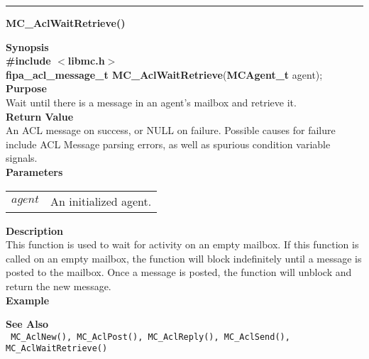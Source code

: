 \noindent
\vspace{5pt}
\rule{6.5in}{0.015in}
\noindent
{}
{\LARGE \bf MC\_AclWaitRetrieve()}\\
\label{api:MC_AclWaitRetrieve()}

\noindent
{\bf Synopsis}\\
{\bf \#include $<$libmc.h$>$}\\
{\bf fipa\_acl\_message\_t MC\_AclWaitRetrieve}({\bf MCAgent\_t} agent);\\

\noindent
{\bf Purpose}\\
Wait until there is a message in an agent's mailbox and retrieve it.\\

\noindent
{\bf Return Value}\\
An ACL message on success, or NULL on failure. Possible causes for failure
include ACL Message parsing errors, as well as spurious condition variable
signals.\\

\noindent
{\bf Parameters}
\vspace{-0.1in}
\begin{description}
\item
\begin{tabular}{p{10 mm}p{145 mm}} 
$agent$ & An initialized agent.
\end{tabular}
\end{description}

\noindent
{\bf Description}\\
This function is used to wait for activity on an empty mailbox. If this
function is called on an empty mailbox, the function will block indefinitely
until a message is posted to the mailbox. Once a message is posted, the
function will unblock and return the new message. \\

\noindent
{\bf Example}\\
\noindent
{\footnotesize}

\noindent
{\bf See Also}\\
\texttt{
  MC\_AclNew(), MC\_AclPost(), MC\_AclReply(), MC\_AclSend(), 
    \linebreak MC\_AclWaitRetrieve()
}

